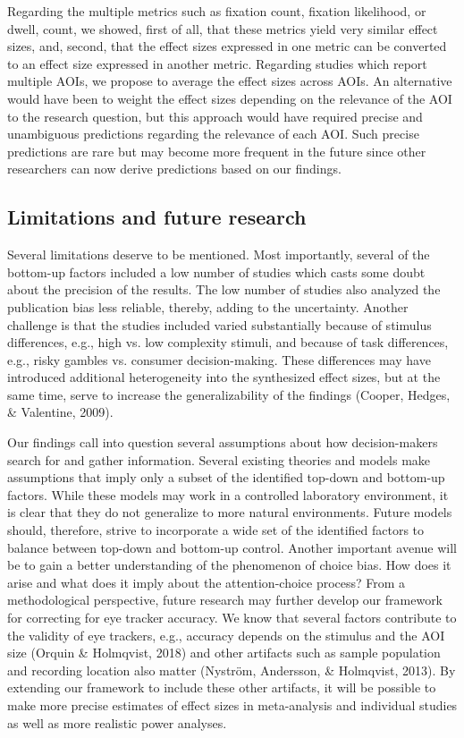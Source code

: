 \documentclass{article}
\begin{document}
Regarding the multiple metrics such as fixation count, fixation likelihood, or dwell, count, we showed, first of all, that these metrics yield very similar effect sizes, and, second, that the effect sizes expressed in one metric can be converted to an effect size expressed in another metric. Regarding studies which report multiple AOIs, we propose to average the effect sizes across AOIs. An alternative would have been to weight the effect sizes depending on the relevance of the AOI to the research question, but this approach would have required precise and unambiguous predictions regarding the relevance of each AOI. Such precise predictions are rare but may become more frequent in the future since other researchers can now derive predictions based on our findings.   


\subsection{Limitations and future research}

Several limitations deserve to be mentioned. Most importantly, several of the bottom-up factors included a low number of studies which casts some doubt about the precision of the results. The low number of studies also analyzed the publication bias less reliable, thereby, adding to the uncertainty. Another challenge is that the studies included varied substantially because of stimulus differences, e.g., high vs. low complexity stimuli, and because of task differences, e.g., risky gambles vs. consumer decision-making. These differences may have introduced additional heterogeneity into the synthesized effect sizes, but at the same time, serve to increase the generalizability of the findings (Cooper, Hedges, \& Valentine, 2009). 

Our findings call into question several assumptions about how decision-makers search for and gather information. Several existing theories and models make assumptions that imply only a subset of the identified top-down and bottom-up factors. While these models may work in a controlled laboratory environment, it is clear that they do not generalize to more natural environments. Future models should, therefore, strive to incorporate a wide set of the identified factors to balance between top-down and bottom-up control. Another important avenue will be to gain a better understanding of the phenomenon of choice bias. How does it arise and what does it imply about the attention-choice process? From a methodological perspective, future research may further develop our framework for correcting for eye tracker accuracy. We know that several factors contribute to the validity of eye trackers, e.g., accuracy depends on the stimulus and the AOI size (Orquin \& Holmqvist, 2018) and other artifacts such as sample population and recording location also matter (Nyström, Andersson, \& Holmqvist, 2013). By extending our framework to include these other artifacts, it will be possible to make more precise estimates of effect sizes in meta-analysis and individual studies as well as more realistic power analyses.    
\end{document}

